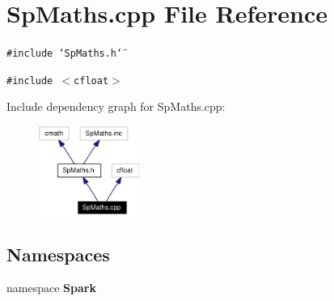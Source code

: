 \section{Sp\-Maths.cpp File Reference}
\label{SpMaths_8cpp}
{\tt \#include \char`\"{}Sp\-Maths.h\char`\"{}}\par
{\tt \#include $<$cfloat$>$}\par


Include dependency graph for Sp\-Maths.cpp:\begin{figure}[H]
\begin{center}
\leavevmode
\includegraphics[width=93pt]{SpMaths_8cpp__incl}
\end{center}
\end{figure}
\subsection*{Namespaces}
\begin{CompactItemize}
\item 
namespace {\bf Spark}
\end{CompactItemize}
